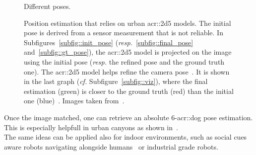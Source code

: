 \begin{figure}[htpb]
{\begin{subfloatrow}[5]
{                        }{
                            \caption{\label{subfig::viz} Different poses.}
                        }
                    \end{subfloatrow}
                }
                {
                    \caption[
                        Position estimation that relies on urban \gls{acr::2d5} models.
                    ]{
                        \label{fig::navigation}
                        Position estimation that relies on urban \gls{acr::2d5} models.
                        The initial pose is derived from a sensor measurement that is not reliable.
                        In Subfigures~\ref{subfig::init_pose} (\textit{resp.}~\ref{subfig::final_pose} and~\ref{subfig::gt_pose}), the \gls{acr::2d5} model is projected on the image using the initial pose (\textit{resp.} the refined pose and the ground truth one).
                        The \gls{acr::2d5} model helps refine the camera pose~\parencite{armagan2017semantic}.
                        It is shown in the last graph (\textit{cf.} Subfigure~\ref{subfig::viz}), where the final estimation (green) is closer to the ground truth (red) than the initial one (blue)~\parencite{armagan2017semantic}.
                        Images taken from~\parencite{armagan2017semantic}.
                    }
                }
            \end{figure}

            Once the image matched, one can retrieve an absolute 6-\gls{acr::dog} pose estimation.
            This is especially helpfull in urban canyons as shown in~\textcite{piasco2018survey}.\\
            The same ideas can be applied also for indoor environments, such as social cues aware robots navigating alongside humans~\parencite{gupta2018social} or industrial grade robots\addref.
       
